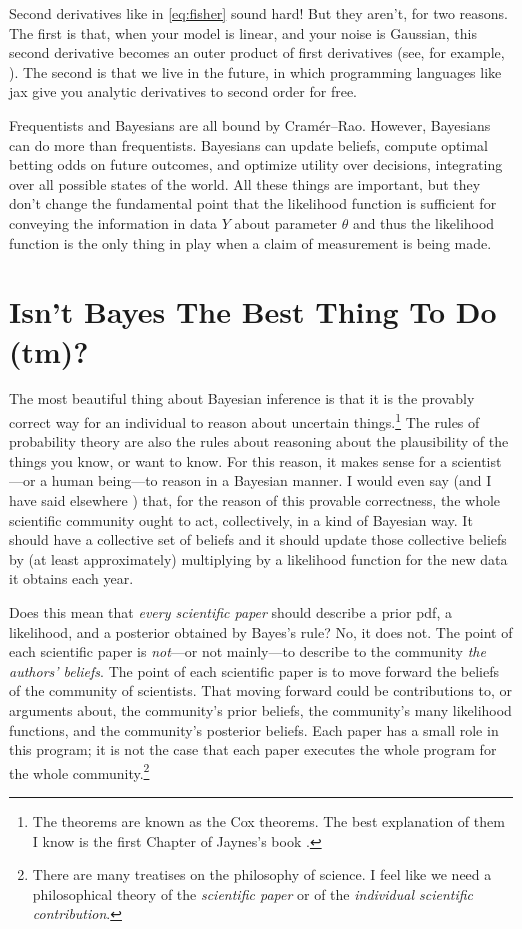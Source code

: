 \documentclass{article}
\begin{document}
Second derivatives like in \eqref{eq:fisher} sound hard!
But they aren't, for two reasons.
The first is that, when your model is linear, and your noise is Gaussian, this second derivative becomes an outer product of first derivatives (see, for example, \cite{fittingaline}).
The second is that we live in the future, in which programming languages like jax \cite{jax} give you analytic derivatives to second order for free.

Frequentists and Bayesians are all bound by Cram\'er--Rao.
However, Bayesians can do more than frequentists.
Bayesians can update beliefs, compute optimal betting odds on future outcomes, and optimize utility over decisions, integrating over all possible states of the world.
All these things are important, but they don't change the fundamental point that the likelihood function is sufficient for conveying the information in data $Y$ about parameter $\theta$ and thus the likelihood function is the only thing in play when a claim of measurement is being made.

\section{Isn't Bayes The Best Thing To Do (tm)?}\label{sec:bayes}
The most beautiful thing about Bayesian inference is that it is the provably correct way for an individual to reason about uncertain things.\footnote{%
The theorems are known as the Cox theorems.
The best explanation of them I know is the first Chapter of Jaynes's book \cite{jaynes}.}
The rules of probability theory are also the rules about reasoning about the plausibility of the things you know, or want to know.
For this reason, it makes sense for a scientist---or a human being---to reason in a Bayesian manner.
I would even say (and I have said elsewhere \cite{plausibility})
that, for the reason of this provable correctness, the whole scientific community ought to act, collectively, in a kind of Bayesian way.
It should have a collective set of beliefs and it should update those collective beliefs by (at least approximately) multiplying by a likelihood function for the new data it obtains each year.

Does this mean that \emph{every scientific paper} should describe a prior pdf, a likelihood, and a posterior obtained by Bayes's rule?
No, it does not.
The point of each scientific paper is \emph{not}---or not mainly---to describe to the community \emph{the authors' beliefs}.
The point of each scientific paper is to move forward the beliefs of the community of scientists.
That moving forward could be contributions to, or arguments about, the community's prior beliefs, the community's many likelihood functions, and the community's posterior beliefs.
Each paper has a small role in this program; it is not the case that each paper executes the whole program for the whole community.\footnote{%
There are many treatises on the philosophy of science.
I feel like we need a philosophical theory of the \emph{scientific paper} or of the \emph{individual scientific contribution}.}
\end{document}
